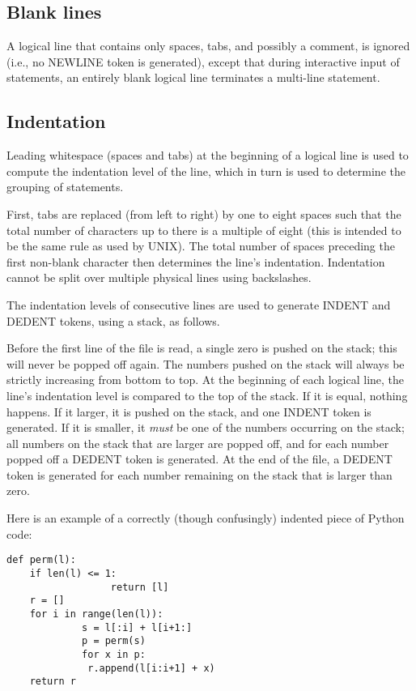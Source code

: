 \subsection{Blank lines}

A logical line that contains only spaces, tabs, and possibly a
comment, is ignored (i.e., no NEWLINE token is generated), except that
during interactive input of statements, an entirely blank logical line
terminates a multi-line statement.

\subsection{Indentation}

Leading whitespace (spaces and tabs) at the beginning of a logical
line is used to compute the indentation level of the line, which in
turn is used to determine the grouping of statements.

First, tabs are replaced (from left to right) by one to eight spaces
such that the total number of characters up to there is a multiple of
eight (this is intended to be the same rule as used by UNIX).  The
total number of spaces preceding the first non-blank character then
determines the line's indentation.  Indentation cannot be split over
multiple physical lines using backslashes.

The indentation levels of consecutive lines are used to generate
INDENT and DEDENT tokens, using a stack, as follows.

Before the first line of the file is read, a single zero is pushed on
the stack; this will never be popped off again.  The numbers pushed on
the stack will always be strictly increasing from bottom to top.  At
the beginning of each logical line, the line's indentation level is
compared to the top of the stack.  If it is equal, nothing happens.
If it larger, it is pushed on the stack, and one INDENT token is
generated.  If it is smaller, it {\em must} be one of the numbers
occurring on the stack; all numbers on the stack that are larger are
popped off, and for each number popped off a DEDENT token is
generated.  At the end of the file, a DEDENT token is generated for
each number remaining on the stack that is larger than zero.

Here is an example of a correctly (though confusingly) indented piece
of Python code:

\begin{verbatim}
def perm(l):
    if len(l) <= 1:
                  return [l]
    r = []
    for i in range(len(l)):
             s = l[:i] + l[i+1:]
             p = perm(s)
             for x in p:
              r.append(l[i:i+1] + x)
    return r
\end{verbatim}

